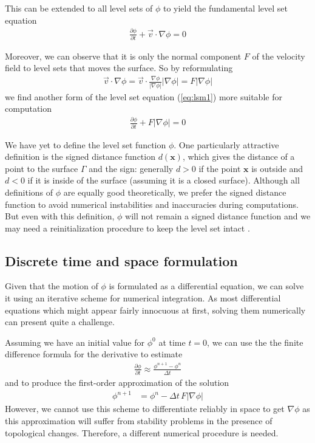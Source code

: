 \documentclass{article}
\begin{document}
This can be extended to all level sets of $\phi$ to yield the fundamental
level set equation
\begin{align}
  \frac{\partial \phi}{\partial t} + \vec{v} \cdot \nabla \phi = 0
  \label{eq:lsm1}
\end{align}

Moreover, we can observe that it is only the normal component $F$ of the
velocity field to level sets that moves the surface. So by reformulating
\begin{align}
  \vec{v} \cdot \nabla \phi
  = \vec{v} \cdot \frac{\nabla \phi}{|\nabla \phi|}|\nabla \phi| 
  = F|\nabla \phi|
\end{align}
we find another form of the level set equation (\ref{eq:lsm1}) more suitable
for computation
\begin{align}
  \frac{\partial \phi}{\partial t} + F|\nabla \phi| = 0
\end{align}

We have yet to define the level set function $\phi$. One particularly
attractive definition is the signed distance function $d(\mathbf{x})$, which
gives the distance of a point to the surface $\Gamma$ and the sign: generally
$d > 0$ if the point $\mathbf{x}$ is outside and $d < 0$ if it is inside of
the surface (assuming it is a closed surface). Although all definitions of
$\phi$ are equally good theoretically, we prefer the signed distance function
to avoid numerical instabilities and inaccuracies during computations. But
even with this definition, $\phi$ will not remain a signed distance function
and we may need a reinitialization procedure to keep the level set intact
\cite{peng1999pde}.

\subsection{Discrete time and space formulation}
Given that the motion of $\phi$ is formulated as a differential equation, we
can solve it using an iterative scheme for numerical integration. As most
differential equations which might appear fairly innocuous at first, solving
them numerically can present quite a challenge.

Assuming we have an initial value for $\phi^0$ at time $t=0$, we can use the the
finite difference formula for the derivative to estimate
\begin{align}
  \frac{\partial \phi}{\partial t} \approx \frac{\phi^{n+1} - \phi^{n}}{\Delta t}
\end{align}
and to produce the first-order approximation of the solution
\begin{align}
  \phi^{n+1} &= \phi^{n} - \Delta t \, F |\nabla \phi|
\end{align}
However, we cannot use this scheme to differentiate reliably in space to get
$\nabla \phi$ as this approximation will suffer from stability problems in the
presence of topological changes. Therefore, a different numerical procedure is
needed.
\end{document}
